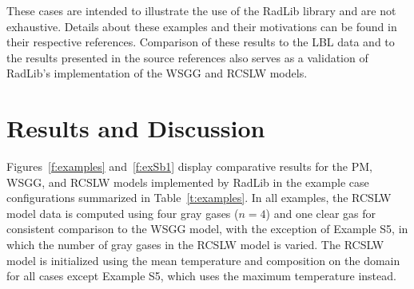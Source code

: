 \documentclass[preprint,12pt]{elsarticle}
\begin{document}
These cases are intended to illustrate the use of the RadLib library and are not exhaustive. Details about these examples and their motivations can be found in their respective references. Comparison of these results to the LBL data and to the results presented in the source references also serves as a validation of RadLib's implementation of the WSGG and RCSLW models. 



\section{Results and Discussion} \label{s:discussion}

Figures~\ref{f:examples} and~\ref{f:exSb1} display comparative results for the PM, WSGG, and RCSLW models implemented by RadLib in the example case configurations summarized in Table~\ref{t:examples}. In all examples, the RCSLW model data is computed using four gray gases ($n=4$) and one clear gas for consistent comparison to the WSGG model, with the exception of Example S5, in which the number of gray gases in the RCSLW model is varied. The RCSLW model is initialized using the mean temperature and composition on the domain for all cases except Example S5, which uses the maximum temperature instead. 
%
\end{document}
